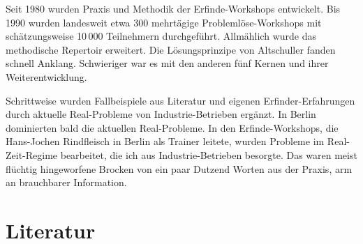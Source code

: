 \documentclass[12pt,a4paper]{article}
\begin{document}
Seit 1980 wurden Praxis und Methodik der Erfinde-Workshops entwickelt. Bis 1990
wurden landesweit etwa 300 mehrtägige Problemlöse-Workshops mit schätzungsweise
10\,000 Teilnehmern durchgeführt. Allmählich wurde das methodische Repertoir
erweitert. Die Lösungsprinzipe von Altschuller fanden schnell Anklang.
Schwieriger war es mit den anderen fünf Kernen und ihrer Weiterentwicklung.

Schrittweise wurden Fallbeispiele aus Literatur und eigenen
Erfinder-Erfahrungen durch aktuelle Real-Probleme von Industrie-Betrieben
ergänzt.  In Berlin dominierten bald die aktuellen Real-Probleme. In den
Erfinde-Workshops, die Hans-Jochen Rindfleisch in Berlin als Trainer leitete,
wurden Probleme im Real-Zeit-Regime bearbeitet, die ich aus Industrie-Betrieben
besorgte. Das waren meist flüchtig hingeworfene Brocken von ein paar Dutzend
Worten aus der Praxis, arm an brauchbarer Information.

\section*{Literatur}
\end{document}
